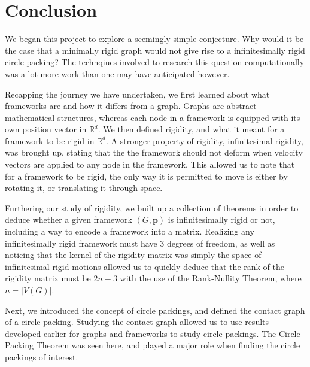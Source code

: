 \chapter{Conclusion}

\begin{flushleft}
We began this project to explore a seemingly simple conjecture. Why would it be the case that a minimally rigid graph would not give rise to a infinitesimally rigid circle packing? The technqiues involved to research this question computationally was a lot more work than one may have anticipated however.
\end{flushleft}

\begin{flushleft}
Recapping the journey we have undertaken, we first learned about what frameworks are and how it differs from a graph. Graphs are abstract mathematical structures, whereas each node in a framework is equipped with its own position vector in $\mathbb{R}^d$. We then defined rigidity, and what it meant for a framework to be rigid in $\mathbb{R}^d$. A stronger property of rigidity, infinitesimal rigidity, was brought up, stating that the the framework should not deform when velocity vectors are applied to any node in the framework. This allowed us to note that for a framework to be rigid, the only way it is permitted to move is either by rotating it, or translating it through space.
\end{flushleft}

\begin{flushleft}
Furthering our study of rigidity, we built up a collection of theorems in order to deduce whether a given framework $(G,\textbf{p})$ is infinitesimally rigid or not, including a way to encode a framework into a matrix. Realizing any infinitesimally rigid framework must have 3 degrees of freedom, as well as noticing that the kernel of the rigidity matrix was simply the space of infinitesimal rigid motions allowed us to quickly deduce that the rank of the rigidity matrix must be $2n-3$ with the use of the Rank-Nullity Theorem, where $n = |V(G)|$. 
\end{flushleft}

\begin{flushleft}
Next, we introduced the concept of circle packings, and defined the contact graph of a circle packing. Studying the contact graph allowed us to use results developed earlier for graphs and frameworks to study circle packings. The Circle Packing Theorem was seen here, and played a major role when finding the circle packings of interest. 
\end{flushleft}

